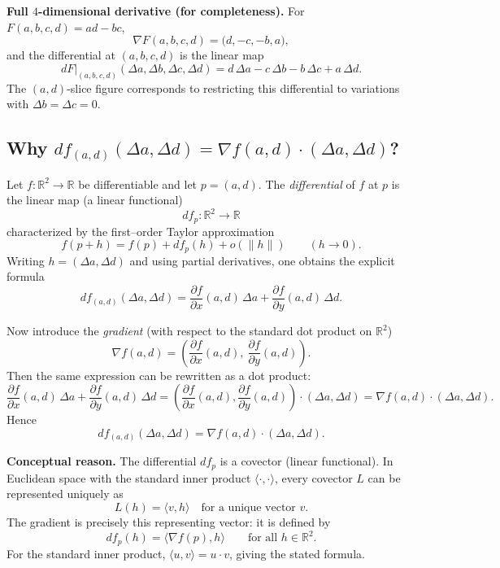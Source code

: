 \documentclass[12pt,a4paper]{article}
\theoremstyle{plain}
\theoremstyle{definition}      %
\begin{document}
	\medskip
	\noindent\textbf{Full $4$-dimensional derivative (for completeness).}
	For $F(a,b,c,d)=ad-bc$,
	\[
	\nabla F(a,b,c,d)=\big(d,-c,-b,a\big),
	\]
	and the differential at $(a,b,c,d)$ is the linear map
	\[
	\boxed{
		dF\big|_{(a,b,c,d)}(\Delta a,\Delta b,\Delta c,\Delta d)
		=d\,\Delta a-c\,\Delta b-b\,\Delta c+a\,\Delta d.}
	\]
	The $(a,d)$-slice figure corresponds to restricting this differential to variations with $\Delta b=\Delta c=0$.
	
	\subsection*{Why $df_{(a,d)}(\Delta a,\Delta d)=\nabla f(a,d)\cdot(\Delta a,\Delta d)$?}
	
	Let $f:\mathbb{R}^2\to\mathbb{R}$ be differentiable and let $p=(a,d)$.
	The \emph{differential} of $f$ at $p$ is the linear map (a linear functional)
	\[
	df_p:\mathbb{R}^2\to\mathbb{R}
	\]
	characterized by the first--order Taylor approximation
	\[
	f(p+h)=f(p)+df_p(h)+o(\|h\|)\qquad (h\to 0).
	\]
	Writing $h=(\Delta a,\Delta d)$ and using partial derivatives, one obtains the explicit formula
	\[
	df_{(a,d)}(\Delta a,\Delta d)=
	\frac{\partial f}{\partial x}(a,d)\,\Delta a
	+\frac{\partial f}{\partial y}(a,d)\,\Delta d.
	\]
	
	Now introduce the \emph{gradient} (with respect to the standard dot product on $\mathbb{R}^2$)
	\[
	\nabla f(a,d)=\left(\frac{\partial f}{\partial x}(a,d),\ \frac{\partial f}{\partial y}(a,d)\right).
	\]
	Then the same expression can be rewritten as a dot product:
	\[
	\frac{\partial f}{\partial x}(a,d)\,\Delta a
	+\frac{\partial f}{\partial y}(a,d)\,\Delta d
	=
	\left(\frac{\partial f}{\partial x}(a,d),\frac{\partial f}{\partial y}(a,d)\right)\cdot(\Delta a,\Delta d)
	=
	\nabla f(a,d)\cdot(\Delta a,\Delta d).
	\]
	Hence
	\[
	df_{(a,d)}(\Delta a,\Delta d)=\nabla f(a,d)\cdot(\Delta a,\Delta d).
	\]
	
	\medskip
	\noindent\textbf{Conceptual reason.}
	The differential $df_p$ is a covector (linear functional). In Euclidean space with the standard inner product
	$\langle\cdot,\cdot\rangle$, every covector $L$ can be represented uniquely as
	\[
	L(h)=\langle v,h\rangle
	\quad\text{for a unique vector }v.
	\]
	The gradient is precisely this representing vector: it is defined by
	\[
	df_p(h)=\langle \nabla f(p),h\rangle\qquad\text{for all }h\in\mathbb{R}^2.
	\]
	For the standard inner product, $\langle u,v\rangle=u\cdot v$, giving the stated formula.
	
	
	
\end{document}
